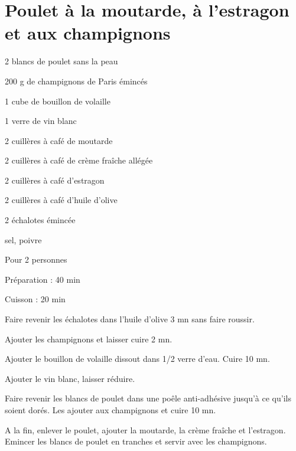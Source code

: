 \section[\normalsize{Poulet à la moutarde, à l'estragon et aux champignons}]{Poulet à la moutarde, à l'estragon et aux champignons}

\begin{ingredients}
\item 2 blancs de poulet sans la peau
\item 200 g de champignons de Paris \'eminc\'es
\item 1 cube de bouillon de volaille
\item 1 verre de vin blanc
\item 2 cuill\`eres \`a caf\'e de moutarde
\item 2 cuill\`eres \`a caf\'e de cr\`eme fra\^iche all\'eg\'ee
\item 2 cuill\`eres \`a caf\'e d'estragon
\item 2 cuill\`eres \`a caf\'e d'huile d'olive
\item 2 \'echalotes \'eminc\'ee
\item sel, poivre
\end{ingredients}
\begin{infos}
\item Pour 2 personnes
\item Préparation : 40 min
\item Cuisson : 20 min
\end{infos}
\begin{etapes}
\item Faire revenir les \'echalotes dans l'huile d'olive 3 mn sans faire roussir. 
\item Ajouter les champignons et laisser cuire 2 mn. 
\item Ajouter le bouillon de volaille dissout dans 1/2 verre d'eau. Cuire 10 mn. 
\item Ajouter le vin blanc, laisser r\'eduire.
\item Faire revenir les blancs de poulet dans une po\^ele anti-adh\'esive jusqu'\`a ce qu'ils soient dor\'es. Les ajouter aux champignons et cuire 10 mn.
\item A la fin, enlever le poulet, ajouter la moutarde, la cr\`eme fra\^iche et l'estragon. Emincer les blancs de poulet en tranches et servir avec les champignons.
\end{etapes}
